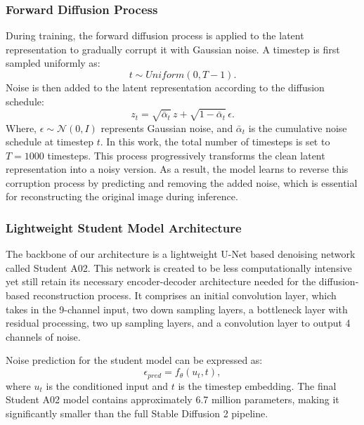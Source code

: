 \documentclass[journal]{IEEEtran}
\begin{document}
\subsubsection{Forward Diffusion Process}
During training, the forward diffusion process is applied to the latent representation to gradually corrupt it with Gaussian noise. A timestep is first sampled uniformly as:
\begin{equation}
t\sim Uniform(0,T-1).
\end{equation}
Noise is then added to the latent representation according to the diffusion schedule:
\begin{equation}
z_t=\sqrt{\bar{\alpha}_t}\,z+\sqrt{1-\bar{\alpha}_t}\,\epsilon.
\end{equation}
Where, $\epsilon\sim\mathcal{N}(0,I)$ represents Gaussian noise, and $\bar{\alpha}_t$ is the cumulative noise schedule at timestep $t$. In this work, the total number of timesteps is set to $T=1000$ timesteps. This process progressively transforms the clean latent representation into a noisy version. As a result, the model learns to reverse this corruption process by predicting and removing the added noise, which is essential for reconstructing the original image during inference.

\subsubsection{Lightweight Student Model Architecture}
The backbone of our architecture is a lightweight U-Net based denoising network called Student A02. This network is created to be less computationally intensive yet still retain its necessary encoder-decoder architecture needed for the diffusion-based reconstruction process. It comprises an initial convolution layer, which takes in the 9-channel input, two down sampling layers, a bottleneck layer with residual processing, two up sampling layers, and a convolution layer to output 4 channels of noise.

Noise prediction for the student model can be expressed as:
\begin{equation}
\epsilon_{pred}=f_{\theta}(u_t,t),
\end{equation}
where $u_t$ is the conditioned input and $t$ is the timestep embedding. The final Student A02 model contains approximately 6.7 million parameters, making it significantly smaller than the full Stable Diffusion 2 pipeline.
\end{document}
